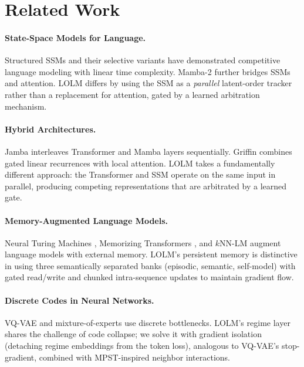 \documentclass{article}
\begin{document}
\section{Related Work}
\label{sec:related}

\paragraph{State-Space Models for Language.}
Structured SSMs \citep{gu2021efficiently} and their selective variants
\citep{gu2023mamba} have demonstrated competitive language modeling with linear
time complexity. Mamba-2 \citep{dao2024transformers} further bridges SSMs and
attention. LOLM differs by using the SSM as a \emph{parallel} latent-order
tracker rather than a replacement for attention, gated by a learned arbitration
mechanism.

\paragraph{Hybrid Architectures.}
Jamba \citep{lieber2024jamba} interleaves Transformer and Mamba layers
sequentially. Griffin \citep{de2024griffin} combines gated linear recurrences
with local attention. LOLM takes a fundamentally different approach: the
Transformer and SSM operate on the same input in parallel, producing competing
representations that are arbitrated by a learned gate.

\paragraph{Memory-Augmented Language Models.}
Neural Turing Machines \citep{graves2014neural}, Memorizing Transformers
\citep{wu2022memorizing}, and $k$NN-LM \citep{khandelwal2020generalization}
augment language models with external memory. LOLM's persistent memory is
distinctive in using three semantically separated banks (episodic, semantic,
self-model) with gated read/write and chunked intra-sequence updates to
maintain gradient flow.

\paragraph{Discrete Codes in Neural Networks.}
VQ-VAE \citep{van2017neural} and mixture-of-experts \citep{shazeer2017moe}
use discrete bottlenecks. LOLM's regime layer shares the challenge of code
collapse; we solve it with gradient isolation (detaching regime embeddings from
the token loss), analogous to VQ-VAE's stop-gradient, combined with
MPST-inspired \citep{leonard2024mpst} neighbor interactions.
\end{document}
